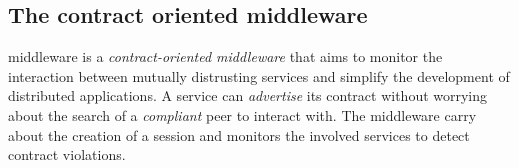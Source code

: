 \subsection{The contract oriented middleware}

\coco middleware  is a \textit{contract-oriented middleware} \cite{CO2middleware}
that aims to monitor the interaction between mutually distrusting
services and simplify the development of distributed applications.
%
A service can \textit{advertise} its contract without worrying about
the search of a \textit{compliant} peer to interact with. The
middleware carry about the creation of a session and monitors the
involved services to detect contract violations.



